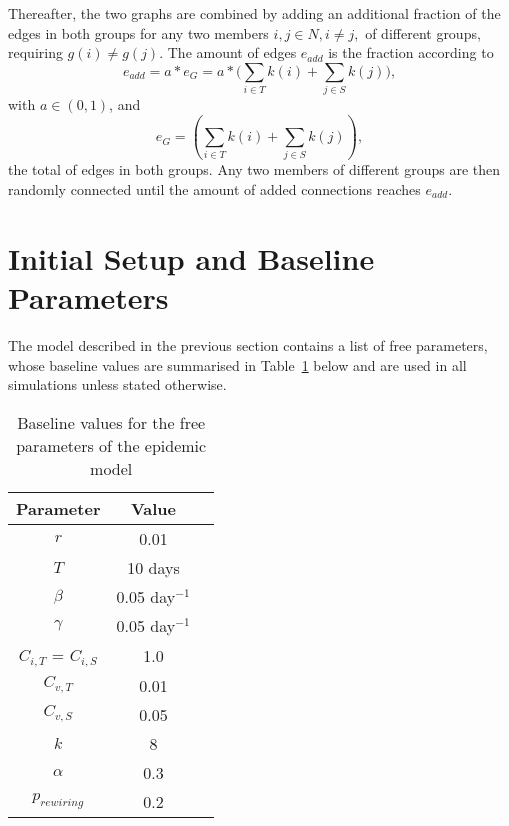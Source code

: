 \documentclass[11pt]{article}
\begin{document}
Thereafter, the two graphs are combined by adding an additional fraction of the edges in both groups for any two members \(i,j\in{N},i\neq j,\) of different groups, requiring \(g(i)\neq g(j)\). The amount of edges \(e_{add}\) is the fraction according to 
\begin{equation}\label{eq:21}
e_{add}=a*e_{G}=a*\bigg(\sum_{i\in{T}}k(i) + \sum_{j\in{S}}k(j)\bigg),
\end{equation}
with \(a\in{(0,1)}\), and 
\begin{equation}\label{eq:22}
	e_{G}=(\sum_{i\in{T}}k(i) + \sum_{j\in{S}}k(j)),
\end{equation} 
the total of edges in both groups. Any two members of different groups are then randomly connected until the amount of added connections reaches \(e_{add}\).  

\section{Initial Setup and Baseline Parameters}
\label{sec:IS}

The model described in the previous section contains a list of free parameters, whose baseline values are summarised in Table~\ref{tab:Table1} below and are used in all simulations unless stated otherwise.

\begin{table}[htbp]
        \centering
        \begin{tabular}{|c|c|c|}
        \hline
                Parameter    &    Value       \\
         \hline
                 \(r\)       &    0.01        \\
	\hline
                 \(T\)       &    10 days        \\
        \hline
                 \(\beta\)   &    0.05 day\(^{-1}\)        \\
        \hline
                 \(\gamma\)   &    0.05  day\(^{-1}\)      \\
        \hline
                 \(C_{i,T}\) = \(C_{i,S}\) &    1.0    \\
        \hline
                 \(C_{v,T}\)  &    0.01       \\
        \hline
		 \(C_{v,S}\)  &    0.05       \\
        \hline
		 \(k\)  &    8      	      \\
        \hline
		 \(\alpha\)  &    0.3         \\
        \hline
		 \(p_{rewiring}\)  &    0.2   \\
        \hline
        \end{tabular}
        \caption{Baseline values for the free parameters of the epidemic model}
        \label{tab:Table1}
    \end{table}
\end{document}

